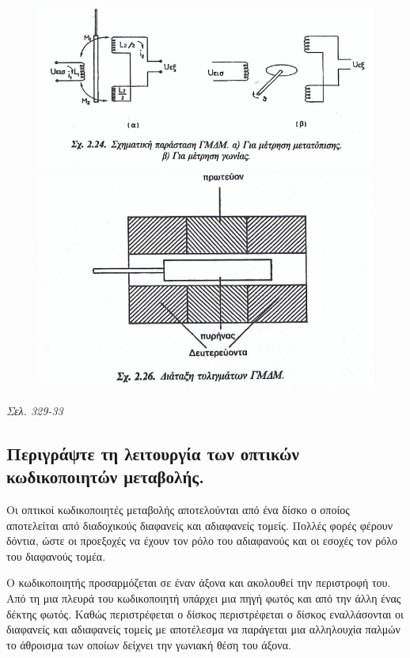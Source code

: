 \documentclass{article}
\begin{document}
\begin{figure}[h!]
    \includegraphics[width=\linewidth]{GMDM1.png}
    \includegraphics[width=\linewidth]{GMDM2.png}
\end{figure}
\emph{Σελ. 329-33}

\subsection{Περιγράψτε τη λειτουργία των οπτικών κωδικοποιητών μεταβολής.}
Οι οπτικοί κωδικοποιητές μεταβολής αποτελούνται από ένα δίσκο ο οποίος αποτελείται από διαδοχικούς διαφανείς και αδιαφανείς τομείς. Πολλές φορές φέρουν δόντια, ώστε οι
προεξοχές να έχουν τον ρόλο του αδιαφανούς και οι εσοχές τον ρόλο του διαφανούς τομέα. 

Ο κωδικοποιητής προσαρμόζεται σε έναν άξονα και ακολουθεί την περιστροφή του. Από τη μια πλευρά του κωδικοποιητή υπάρχει μια πηγή φωτός και από την άλλη ένας δέκτης φωτός.
Καθώς περιστρέφεται ο δίσκος περιστρέφεται ο δίσκος εναλλάσονται οι διαφανείς και αδιαφανείς τομείς με αποτέλεσμα να παράγεται μια αλληλουχία παλμών το άθροισμα των οποίων 
δείχνει την γωνιακή θέση του άξονα. 
\end{document}
